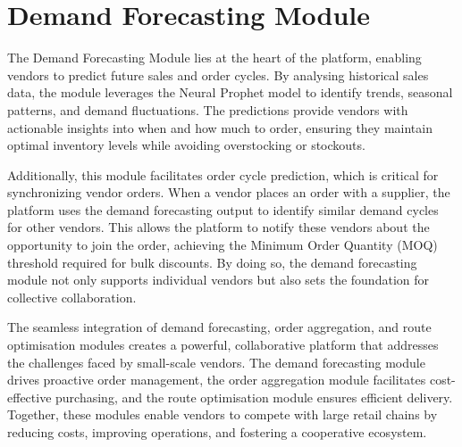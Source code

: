 \section{Demand Forecasting Module}

The Demand Forecasting Module lies at the heart of the platform, enabling vendors to predict future sales and order cycles. By analysing historical sales data, the module leverages the Neural Prophet model to identify trends, seasonal patterns, and demand fluctuations. The predictions provide vendors with actionable insights into when and how much to order, ensuring they maintain optimal inventory levels while avoiding overstocking or stockouts.

Additionally, this module facilitates order cycle prediction, which is critical for synchronizing vendor orders. When a vendor places an order with a supplier, the platform uses the demand forecasting output to identify similar demand cycles for other vendors. This allows the platform to notify these vendors about the opportunity to join the order, achieving the Minimum Order Quantity (MOQ) threshold required for bulk discounts. By doing so, the demand forecasting module not only supports individual vendors but also sets the foundation for collective collaboration.


The seamless integration of demand forecasting, order aggregation, and route optimisation modules creates a powerful, collaborative platform that addresses the challenges faced by small-scale vendors. The demand forecasting module drives proactive order management, the order aggregation module facilitates cost-effective purchasing, and the route optimisation module ensures efficient delivery. Together, these modules enable vendors to compete with large retail chains by reducing costs, improving operations, and fostering a cooperative ecosystem.
